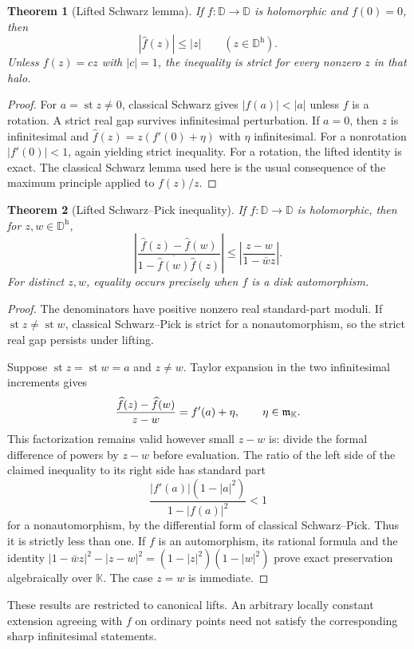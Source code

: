 \documentclass[11pt,a4paper]{article}
\newtheorem{theorem}{Theorem}[section]
\theoremstyle{definition}\newtheorem{definition}[theorem]{Definition}
\theoremstyle{remark}\newtheorem{remark}[theorem]{Remark}
\newcommand{\K}{\mathbb K}
\newcommand{\st}{\operatorname{st}}\newcommand{\supp}{\operatorname{supp}}
\newcommand{\ev}[1]{\widehat{#1}}
\newcommand{\halo}[1]{#1^{\mathrm h}}
\numberwithin{equation}{section}
\begin{document}
\begin{theorem}[Lifted Schwarz lemma]\label{thm:Schwarz}
If $f:\mathbb D\to\mathbb D$ is holomorphic and $f(0)=0$, then
\[
 |\ev f(z)|\leq |z|\qquad(z\in\halo{\mathbb D}).
\]
Unless $f(z)=cz$ with $|c|=1$, the inequality is strict for every nonzero $z$ in that halo.
\end{theorem}
\begin{proof}
For $a=\st z\ne0$, classical Schwarz gives $|f(a)|<|a|$ unless $f$ is a rotation. A strict real gap survives infinitesimal perturbation. If $a=0$, then $z$ is infinitesimal and
$\ev f(z)=z(f'(0)+\eta)$ with $\eta$ infinitesimal. For a nonrotation $|f'(0)|<1$, again yielding strict inequality. For a rotation, the lifted identity is exact. The classical Schwarz lemma used here is the usual consequence of the maximum principle applied to $f(z)/z$.
\end{proof}

\begin{theorem}[Lifted Schwarz--Pick inequality]\label{thm:SchwarzPick}
If $f:\mathbb D\to\mathbb D$ is holomorphic, then for $z,w\in\halo{\mathbb D}$,
\[
 \left|\frac{\ev f(z)-\ev f(w)}{1-\overline{\ev f(w)}\ev f(z)}\right|
 \leq
 \left|\frac{z-w}{1-\bar w z}\right|.
\]
For distinct $z,w$, equality occurs precisely when $f$ is a disk automorphism.
\end{theorem}
\begin{proof}
The denominators have positive nonzero real standard-part moduli. If $\st z\ne\st w$, classical Schwarz--Pick is strict for a nonautomorphism, so the strict real gap persists under lifting.

Suppose $\st z=\st w=a$ and $z\ne w$. Taylor expansion in the two infinitesimal increments gives
\[
 \frac{\ev f(z)-\ev f(w)}{z-w}=f'(a)+\eta,
 \qquad \eta\in\infinit.
\]
This factorization remains valid however small $z-w$ is: divide the formal difference of powers by $z-w$ before evaluation. The ratio of the left side of the claimed inequality to its right side has standard part
\[
 \frac{|f'(a)|(1-|a|^2)}{1-|f(a)|^2}<1
\]
for a nonautomorphism, by the differential form of classical Schwarz--Pick. Thus it is strictly less than one. If $f$ is an automorphism, its rational formula and the identity
$|1-\bar wz|^2-|z-w|^2=(1-|z|^2)(1-|w|^2)$ prove exact preservation algebraically over $\K$. The case $z=w$ is immediate.
\end{proof}
These results are restricted to canonical lifts. An arbitrary locally constant extension agreeing with $f$ on ordinary points need not satisfy the corresponding sharp infinitesimal statements.
\end{document}
